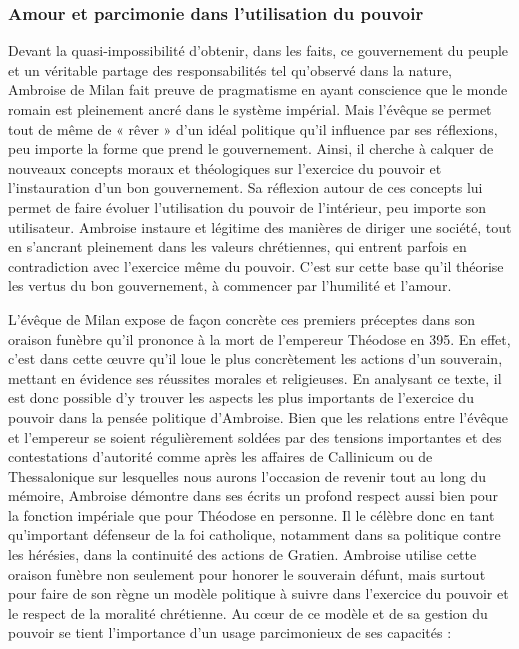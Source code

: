 \subsubsection{Amour et parcimonie dans l'utilisation du pouvoir}

Devant la quasi-impossibilité d’obtenir, dans les faits, ce gouvernement du peuple et un véritable partage des responsabilités tel qu'observé dans la nature, Ambroise de Milan fait preuve de pragmatisme en ayant conscience que le monde romain est pleinement ancré dans le système impérial. Mais l'évêque se permet tout de même de « rêver » d'un idéal politique qu'il influence par ses réflexions, peu importe la forme que prend le gouvernement. Ainsi, il cherche à calquer de nouveaux concepts moraux et théologiques sur l'exercice du pouvoir et l'instauration d'un bon gouvernement. Sa réflexion autour de ces concepts lui permet de faire évoluer l'utilisation du pouvoir de l'intérieur, peu importe son utilisateur. Ambroise instaure et légitime des manières de diriger une société, tout en s'ancrant pleinement dans les valeurs chrétiennes, qui entrent parfois en contradiction avec l'exercice même du pouvoir. C'est sur cette base qu'il théorise les vertus du bon gouvernement, à commencer par l'humilité et l'amour.

\bigskip

L'évêque de Milan expose de façon concrète ces premiers préceptes dans son oraison funèbre qu'il prononce à la mort de l'empereur Théodose en 395. En effet, c'est dans cette œuvre qu'il loue le plus concrètement les actions d'un souverain, mettant en évidence ses réussites morales et religieuses. En analysant ce texte, il est donc possible d'y trouver les aspects les plus importants de l'exercice du pouvoir dans la pensée politique d'Ambroise. Bien que les relations entre l'évêque et l'empereur se soient régulièrement soldées par des tensions importantes et des contestations d'autorité comme après les affaires de Callinicum ou de Thessalonique sur lesquelles nous aurons l'occasion de revenir tout au long du mémoire, Ambroise démontre dans ses écrits un profond respect aussi bien pour la fonction impériale que pour Théodose en personne. Il le célèbre donc en tant qu'important défenseur de la foi catholique, notamment dans sa politique contre les hérésies, dans la continuité des actions de Gratien. Ambroise utilise cette oraison funèbre non seulement pour honorer le souverain défunt, mais surtout pour faire de son règne un modèle politique à suivre dans l'exercice du pouvoir et le respect de la moralité chrétienne. Au cœur de ce modèle et de sa gestion du pouvoir se tient l'importance d'un usage parcimonieux de ses capacités :


